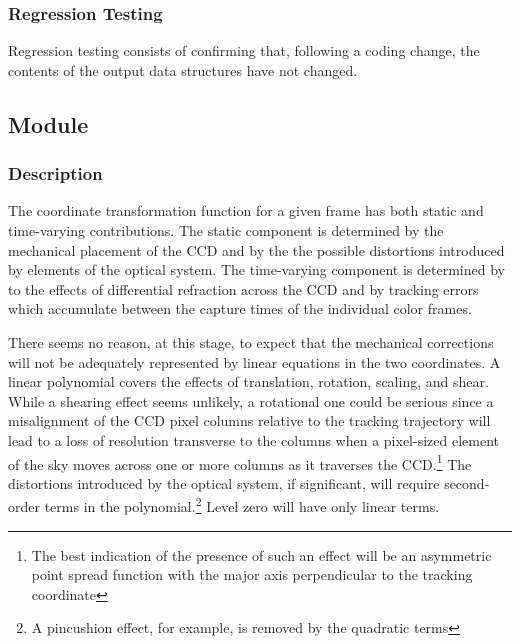                     
\subsubsection{Regression Testing}          

Regression testing consists of confirming that, following a coding change, the
contents of the output data structures have not changed.

\subsection{Module}
\subsubsection{Description}

The coordinate transformation function for a given frame has both static and
time-varying contributions.
The static component is determined by the mechanical placement of the CCD and
by the the possible distortions introduced by elements of the optical system.
The time-varying component is determined by to the effects of differential
refraction across the CCD and by tracking errors which accumulate between the
capture times of the individual color frames.

There seems no reason, at this stage, to expect that the mechanical corrections
will not be adequately represented by linear equations in the two coordinates.
A linear polynomial covers the effects of translation, rotation, scaling, and
shear.
While a shearing effect seems unlikely, a rotational one could be serious since
a misalignment of the CCD pixel columns relative to the tracking trajectory
will lead to a loss of resolution transverse to the columns when a pixel-sized
element of the sky moves across one or more columns as it traverses the
CCD.\footnote{The best indication of the presence of such an effect will be an
asymmetric point spread function with the major axis perpendicular to the
tracking coordinate}
The distortions introduced by the optical system, if significant, will require
second-order terms in the
polynomial.\footnote{A pincushion effect, for example, is removed by the
quadratic terms}
Level zero will have only linear terms.

